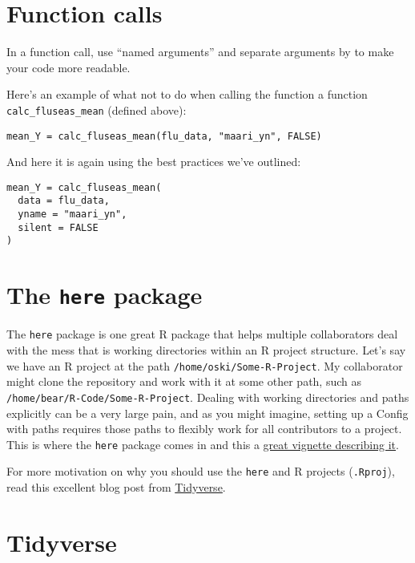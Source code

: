 \documentclass[]{book}
\begin{document}
\hypertarget{function-calls}{%
\section{Function calls}\label{function-calls}}

In a function call, use ``named arguments'' and separate arguments by to make your code more readable.

Here's an example of what not to do when calling the function a function \texttt{calc\_fluseas\_mean} (defined above):

\begin{verbatim}
mean_Y = calc_fluseas_mean(flu_data, "maari_yn", FALSE)
\end{verbatim}

And here it is again using the best practices we've outlined:

\begin{verbatim}
mean_Y = calc_fluseas_mean(
  data = flu_data, 
  yname = "maari_yn",
  silent = FALSE
)
\end{verbatim}

\hypertarget{the-here-package}{%
\section{\texorpdfstring{The \texttt{here} package}{The here package}}\label{the-here-package}}

The \texttt{here} package is one great R package that helps multiple collaborators deal with the mess that is working directories within an R project structure. Let's say we have an R project at the path \texttt{/home/oski/Some-R-Project}. My collaborator might clone the repository and work with it at some other path, such as \texttt{/home/bear/R-Code/Some-R-Project}. Dealing with working directories and paths explicitly can be a very large pain, and as you might imagine, setting up a Config with paths requires those paths to flexibly work for all contributors to a project. This is where the \texttt{here} package comes in and this a \href{https://github.com/jennybc/here_here}{great vignette describing it}.

For more motivation on why you should use the \texttt{here} and R projects (\texttt{.Rproj}), read this excellent blog post from \href{https://www.tidyverse.org/articles/2017/12/workflow-vs-script/}{Tidyverse}.

\hypertarget{tidyverse}{%
\section{Tidyverse}\label{tidyverse}}
\end{document}
